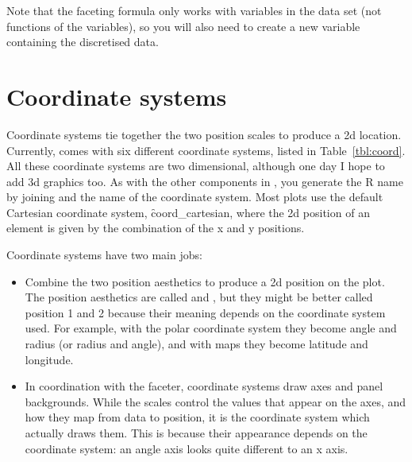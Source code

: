 Note that the faceting formula only works with variables in the data set (not functions of the variables), so you will also need to create a new variable containing the discretised data.

\section{Coordinate systems}
\label{sec:coord}

Coordinate systems tie together the two position scales to produce a 2d location. Currently, \ggplot comes with six different coordinate systems, listed in Table~\ref{tbl:coord}.  All these coordinate systems are two dimensional, although one day I hope to add 3d graphics too. As with the other components in \ggplot, you generate the R name by joining  and the name of the coordinate system.  Most plots use the default Cartesian coordinate system, \f{coord_cartesian}, where the 2d position of an element is given by the combination of the x and y positions.  

Coordinate systems have two main jobs: 

\begin{itemize}
  \item Combine the two position aesthetics to produce a 2d position on the plot.  The position aesthetics are called  and , but they might be better called position 1 and 2 because their meaning depends on the coordinate system used.  For example, with the polar coordinate system they become angle and radius (or radius and angle), and with maps they become latitude and longitude.
  
  \item In coordination with the faceter, coordinate systems draw axes and panel backgrounds.  While the scales control the values that appear on the axes, and how they map from data to position, it is the coordinate system which actually draws them.  This is because their appearance depends on the coordinate system: an angle axis looks quite different to an x axis. 

\end{itemize}


